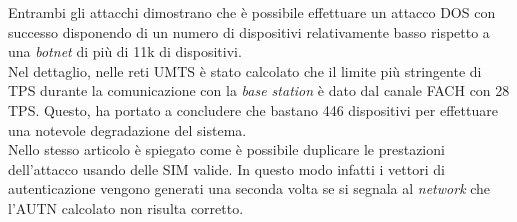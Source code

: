 Entrambi gli attacchi dimostrano che è possibile effettuare un attacco DOS con successo disponendo di un numero di dispositivi relativamente basso rispetto a una \textit{botnet} di più di 11k di dispositivi.\\
Nel dettaglio, nelle reti UMTS è stato calcolato che il limite più stringente di TPS durante la comunicazione con la \textit{base station} è dato dal canale FACH con 28 TPS.
Questo, ha portato a concludere che bastano 446 dispositivi per effettuare una notevole degradazione del sistema.\\
Nello stesso articolo è spiegato come è possibile duplicare le prestazioni dell'attacco usando delle SIM valide. In questo modo infatti i vettori di autenticazione vengono generati una seconda volta se si segnala al
\textit{network} che l'AUTN calcolato non risulta corretto.
